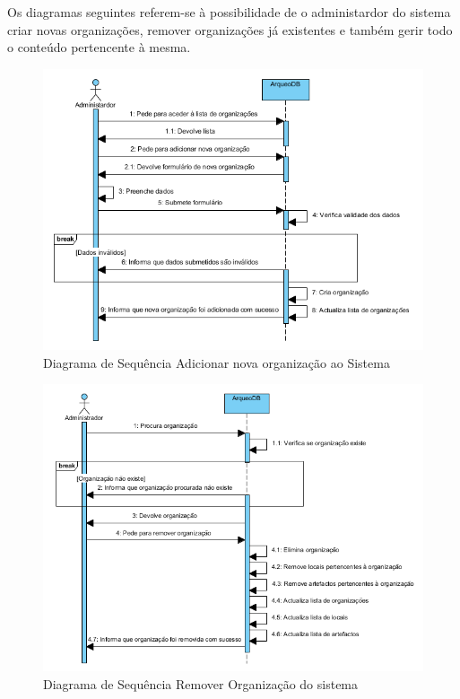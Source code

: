 \documentclass[12pt,a4paper]{article}
\begin{document}
\clearpage
Os diagramas seguintes referem-se à possibilidade de o administardor do sistema criar novas organizações, remover organizações já existentes e também gerir todo o conteúdo pertencente à mesma.\\

\begin{figure}[h!]
\centering
\includegraphics[scale=1]{sequencia/A_criarorganizacao}
\caption{Diagrama de Sequência Adicionar nova organização ao Sistema} 
\end{figure}  

\begin{figure}[h!]
\centering
\includegraphics[scale=1]{sequencia/A_removerorganizacao}
\caption{Diagrama de Sequência Remover Organização do sistema} 
\end{figure}  
\end{document}
